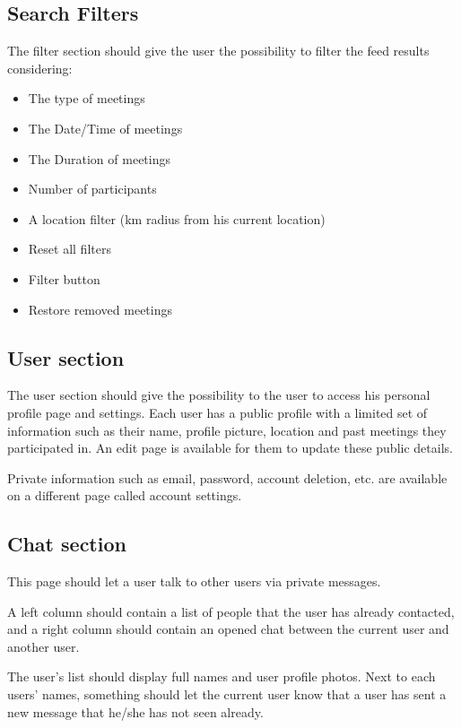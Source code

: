 \documentclass[conference]{IEEEtran}
\begin{document}
\subsection{Search Filters}

The filter section should give the user the possibility to filter the feed results considering:

\begin{itemize}
\item The type of meetings
\item The Date/Time of meetings
\item The Duration of meetings
\item Number of participants
\item A location filter (km radius from his current
location)
\item Reset all filters
\item Filter button
\item Restore removed meetings
\end{itemize}

\subsection{User section}

The user section should give the possibility to the user to
access his personal profile page and settings. Each user has a public profile with a limited set of information such as their name, profile picture, location and past meetings they participated in. An edit page is available for them to update these public details.

Private information such as email, password, account deletion, etc. are available on a different page called account settings.

\subsection{Chat section}

This page should let a user talk to other users via private
messages.

A left column should contain a list of people that the user
has already contacted, and a right column should contain an opened chat between the current user and another user.

The user’s list should display full names and user profile photos. Next to each users' names, something should let the current user know that a user has sent a new message that he/she has not seen already.
\end{document}
